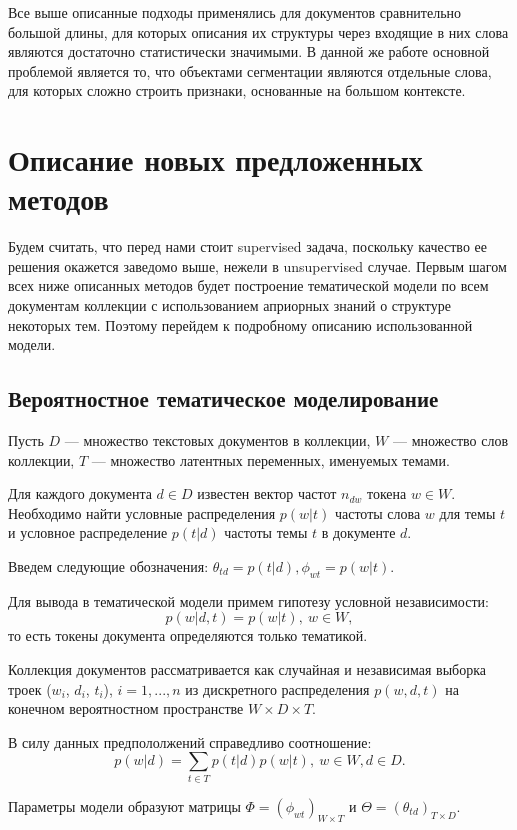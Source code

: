\documentclass[pdftex,ptm,12pt,a4paper]{report}
\theoremstyle{definition}
\begin{document}
Все выше описанные подходы применялись для документов сравнительно большой длины, для которых описания их структуры через входящие в них слова являются достаточно статистически значимыми. В данной же работе основной проблемой является то, что объектами сегментации являются отдельные слова, для которых сложно строить признаки, основанные на большом контексте. 

\chapter{Описание новых предложенных методов}

Будем считать, что перед нами стоит supervised задача, поскольку качество ее решения окажется заведомо выше, нежели в unsupervised случае. Первым шагом всех ниже описанных методов будет построение тематической модели по всем документам коллекции с использованием априорных знаний о структуре некоторых тем. Поэтому перейдем к подробному описанию использованной модели.

\section{Вероятностное тематическое моделирование}

Пусть $D$ --- множество текстовых документов в коллекции, $W$ --- множество слов коллекции, $T$ --- множество латентных переменных, именуемых темами.

Для каждого документа $d \in D$ известен вектор частот $n_{dw}$ токена $w\in W$.  Необходимо найти условные распределения $p(w|t)$ частоты слова $w$ для темы $t$ и условное распределение $p(t|d)$ частоты темы $t$ в документе $d$. 

Введем следующие обозначения: $\theta_{td} = p(t|d), \phi_{wt} = p(w|t). $   

Для вывода в тематической модели примем гипотезу условной независимости:
\[
	 p(w|d,t) = p(w|t), ~ w \in W,
\]
то есть токены документа определяются только тематикой.

Коллекция документов рассматривается как случайная и независимая выборка
троек ($w_i$, $d_i$, $t_i$), $i = 1,..., n$ из дискретного распределения $p(w, d, t)$ на конечном вероятностном пространстве $W \times D \times T$.

В силу данных предпололжений справедливо соотношение:
\[p(w|d) = \sum_{t\in T}p(t|d)p(w|t), ~ w \in W, d\in D.\]

Параметры модели образуют матрицы $\Phi = (\phi_{wt})_{W \times T}$ и $\Theta=(\theta_{td})_{T \times D}$.
\end{document}
